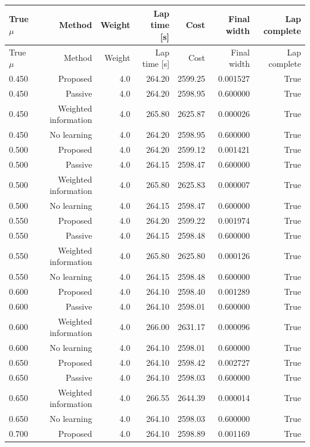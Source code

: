 \begin{longtable}{lrrrrrr}
\toprule
True $\mu$ & Method & Weight & Lap time [s] & Cost & Final width & Lap complete \\
\midrule
\endfirsthead
\toprule
True $\mu$ & Method & Weight & Lap time [s] & Cost & Final width & Lap complete \\
\midrule
\endhead
0.450 & Proposed & 4.0 & 264.20 & 2599.25 & 0.001527 & True \\
0.450 & Passive & 4.0 & 264.20 & 2598.95 & 0.600000 & True \\
0.450 & Weighted information & 4.0 & 265.80 & 2625.87 & 0.000026 & True \\
0.450 & No learning & 4.0 & 264.20 & 2598.95 & 0.600000 & True \\
0.500 & Proposed & 4.0 & 264.20 & 2599.12 & 0.001421 & True \\
0.500 & Passive & 4.0 & 264.15 & 2598.47 & 0.600000 & True \\
0.500 & Weighted information & 4.0 & 265.80 & 2625.83 & 0.000007 & True \\
0.500 & No learning & 4.0 & 264.15 & 2598.47 & 0.600000 & True \\
0.550 & Proposed & 4.0 & 264.20 & 2599.22 & 0.001974 & True \\
0.550 & Passive & 4.0 & 264.15 & 2598.48 & 0.600000 & True \\
0.550 & Weighted information & 4.0 & 265.80 & 2625.80 & 0.000126 & True \\
0.550 & No learning & 4.0 & 264.15 & 2598.48 & 0.600000 & True \\
0.600 & Proposed & 4.0 & 264.10 & 2598.40 & 0.001289 & True \\
0.600 & Passive & 4.0 & 264.10 & 2598.01 & 0.600000 & True \\
0.600 & Weighted information & 4.0 & 266.00 & 2631.17 & 0.000096 & True \\
0.600 & No learning & 4.0 & 264.10 & 2598.01 & 0.600000 & True \\
0.650 & Proposed & 4.0 & 264.10 & 2598.42 & 0.002727 & True \\
0.650 & Passive & 4.0 & 264.10 & 2598.03 & 0.600000 & True \\
0.650 & Weighted information & 4.0 & 266.55 & 2644.39 & 0.000014 & True \\
0.650 & No learning & 4.0 & 264.10 & 2598.03 & 0.600000 & True \\
0.700 & Proposed & 4.0 & 264.10 & 2598.89 & 0.001169 & True \\

\end{longtable}
